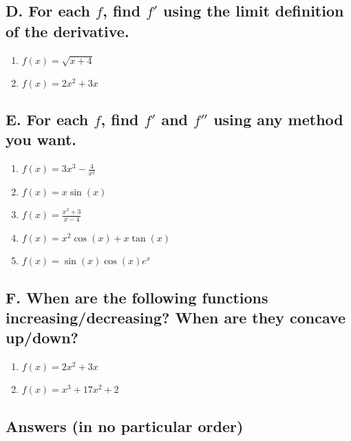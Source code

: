 \documentclass{article}
\begin{document}
\subsection*{D. For each $f$, find $f'$ using the limit definition of the derivative.}

\begin{enumerate}
\item $f(x)=\sqrt{x+4}$
\item $f(x)=2x^2 + 3x$
\end{enumerate}

\subsection*{E. For each $f$, find $f'$ and $f''$ using any method you want.}

\begin{enumerate}
\item $f(x)=3x^3-\frac{4}{x^2}$
\item $f(x)=x\sin(x)$
\item $f(x)=\frac{x^2+3}{x-4}$
\item $f(x)=x^2\cos(x)+x\tan(x)$
\item $f(x)=\sin(x)\cos(x)e^x$
\end{enumerate}

\subsection*{F. When are the following functions increasing/decreasing? When are they concave up/down?}

\begin{enumerate}
\item $f(x)=2x^2+3x$
\item $f(x)=x^3+17x^2+2$
\end{enumerate}

\hline

\subsection*{Answers (in no particular order)}
\end{document}
